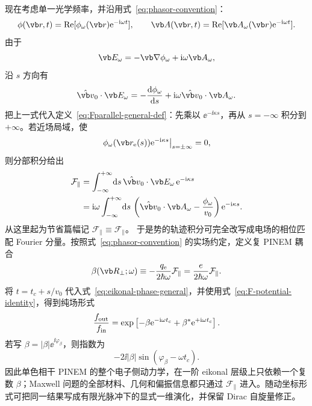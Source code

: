 现在考虑单一光学频率，并沿用式~\cref{eq:phasor-convention}：
\begin{equation}
\phi(\vb r,t)=\operatorname{Re}[\phi_\omega(\vb r)\ee^{-\ii\omega t}],
\qquad
\vb A(\vb r,t)=\operatorname{Re}[\vb A_\omega(\vb r)\ee^{-\ii\omega t}].
\end{equation}
由于
\begin{equation}
\vb E_\omega=-\vb\nabla\phi_\omega+\ii\omega\vb A_\omega,
\label{eq:E-from-potentials-phasor}
\end{equation}
沿 $s$ 方向有
\begin{equation}
\hat{\vb v}_0\cdot\vb E_\omega
=-\frac{\dd\phi_\omega}{\dd s}
+\ii\omega\hat{\vb v}_0\cdot\vb A_\omega.
\end{equation}
把上一式代入定义~\cref{eq:Fparallel-general-def}：先乘以 $\ee^{-\ii\kappa s}$，再从 $s=-\infty$ 积分到 $+\infty$。若近场局域，使
\begin{equation}
\left.\phi_\omega(\vb r_{\rm e}(s))\ee^{-\ii\kappa s}\right|_{s=\pm\infty}=0,
\label{eq:localized-potential-boundary}
\end{equation}
则分部积分给出
\begin{align}
\mathcal F_{\parallel}
&=\int_{-\infty}^{+\infty}\!\dd s\,
\hat{\vb v}_0\cdot\vb E_\omega\,
\ee^{-\ii\kappa s}\\
&=\ii\omega\int_{-\infty}^{+\infty}\!\dd s\,
\left(\hat{\vb v}_0\cdot\vb A_\omega-\frac{\phi_\omega}{v_0}\right)
\ee^{-\ii\kappa s}.
\label{eq:F-potential-identity}
\end{align}
从这里起为节省篇幅记 $\mathcal F_{\parallel}\equiv\mathcal F_{\parallel}$。
于是势的轨迹积分可完全改写成电场的相位匹配 Fourier 分量。按照式~\cref{eq:phasor-convention} 的实场约定，定义复 PINEM 耦合
\begin{equation}
{
\beta(\vb R_\perp;\omega)
\equiv-\frac{q_{\rm e}}{2\hbar\omega}\mathcal F_{\parallel}
=\frac{e}{2\hbar\omega}\mathcal F_{\parallel}.}
\label{eq:beta-standard}
\end{equation}
将 $t=t_c+s/v_0$ 代入式~\cref{eq:eikonal-phase-general}，并使用式~\cref{eq:F-potential-identity}，得到纯场形式
\begin{equation}
{
\frac{f_{\rm out}}{f_{\rm in}}
=\exp\left[-\beta\mathrm{e}^{-\mathrm{i}\omega t_c}
+\beta^*\mathrm{e}^{+\mathrm{i}\omega t_c}\right].}
\label{eq:universal-phase-beta}
\end{equation}
若写 $\beta=|\beta|\ee^{\ii\varphi_\beta}$，则指数为
\begin{equation}
-2\ii|\beta|\sin(\varphi_\beta-\omega t_c).
\end{equation}
因此单色相干 PINEM 的整个电子侧动力学，在一阶 eikonal 层级上只依赖一个复数 $\beta$；Maxwell 问题的全部材料、几何和偏振信息都只通过 $\mathcal F_{\parallel}$ 进入。随动坐标形式可把同一结果写成有限光脉冲下的显式一维演化，并保留 Dirac 自旋量修正。


